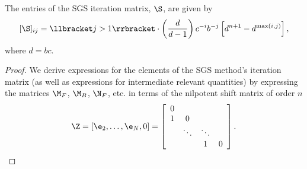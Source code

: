 \begin{thm}\label{thm:1D:matSentries}
The entries of the SGS iteration matrix, $\S$, are given by
\begin{equation}\label{eq:1D:Smatentries}
[\S]_{ij}=%
\llbracket j>1\rrbracket \cdot
\left(\frac{d}{d-1}\right)c^{-i}b^{-j}\left[d^{n+1}-d^{\max(i,j)} \right],
\end{equation}
where $d=bc$.
\end{thm}
\begin{proof}
We derive expressions for the elements of the SGS method's iteration matrix (as
well as expressions for intermediate relevant quantities) by expressing the
matrices $\M_F$, $\M_B$, $\N_F$, etc. in terms of the nilpotent shift matrix
 of order $n$
 \begin{equation*}
\Z=[\e_2,\ldots,\e_N,0]  =
\left[
\begin{array}{cccc}
0 & & &\\
1 & 0  & & \\
 & \ddots & \ddots & \\
& & 1 & 0
\end{array}
\right].
\end{equation*}


\end{proof}
